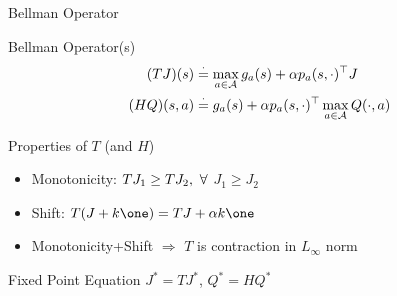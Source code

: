 \documentclass[10pt,handout]{beamer}
\begin{document}
\begin{frame}[fragile]{Bellman Operator}

\begin{block}{Bellman Operator(s)}
\begin{align*}
(TJ)(s)&\stackrel{\cdot}{=}\max_{a\in \mathcal{A}} g_a(s)+\alpha p_a(s,\cdot)^\top J\\
(HQ)(s,a)&\stackrel{\cdot}{=} g_a(s)+\alpha p_a(s,\cdot)^\top \max_{a\in \mathcal{A}}Q(\cdot,a)
\end{align*}
\end{block}
\begin{block}{Properties of $T$ (and $H$)}
\begin{itemize}
\item {Monotonicity:} $T J_1\geq T J_2, \mbox{ } \forall$ $J_1\geq J_2$
\item {Shift:} $T (J+k\one)= T J+\alpha k\one$
\item Monotonicity+Shift $\Rightarrow$ $T$ is contraction in $L_\infty$ norm
\end{itemize}
\end{block}

\begin{block}{Fixed Point Equation}
\centering $J^*=TJ^*$, $Q^*=HQ^*$
\end{block}
\end{frame}
\end{document}

